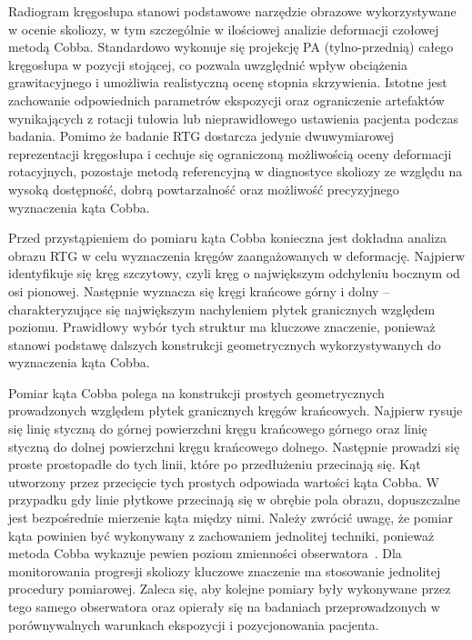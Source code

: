 Radiogram kręgosłupa stanowi podstawowe narzędzie obrazowe wykorzystywane w ocenie skoliozy, w tym szczególnie w ilościowej analizie deformacji czołowej metodą Cobba.
Standardowo wykonuje się projekcję PA (tylno-przednią) całego kręgosłupa w pozycji stojącej, co pozwala uwzględnić wpływ obciążenia grawitacyjnego i umożliwia realistyczną ocenę stopnia skrzywienia.
Istotne jest zachowanie odpowiednich parametrów ekspozycji oraz ograniczenie artefaktów wynikających z rotacji tułowia lub nieprawidłowego ustawienia pacjenta podczas badania.
Pomimo że badanie RTG dostarcza jedynie dwuwymiarowej reprezentacji kręgosłupa i cechuje się ograniczoną możliwością oceny deformacji rotacyjnych, pozostaje metodą referencyjną w diagnostyce skoliozy ze względu na wysoką dostępność, dobrą powtarzalność oraz możliwość precyzyjnego wyznaczenia kąta Cobba.

Przed przystąpieniem do pomiaru kąta Cobba konieczna jest dokładna analiza obrazu RTG w celu wyznaczenia kręgów zaangażowanych w deformację.
Najpierw identyfikuje się kręg szczytowy, czyli kręg o największym odchyleniu bocznym od osi pionowej.
Następnie wyznacza się kręgi krańcowe górny i dolny -- charakteryzujące się największym nachyleniem płytek granicznych względem poziomu.
Prawidłowy wybór tych struktur ma kluczowe znaczenie, ponieważ stanowi podstawę dalszych konstrukcji geometrycznych wykorzystywanych do wyznaczenia kąta Cobba.

Pomiar kąta Cobba polega na konstrukcji prostych geometrycznych prowadzonych względem płytek granicznych kręgów krańcowych.
Najpierw rysuje się linię styczną do górnej powierzchni kręgu krańcowego górnego oraz linię styczną do dolnej powierzchni kręgu krańcowego dolnego.
Następnie prowadzi się proste prostopadłe do tych linii, które po przedłużeniu przecinają się. Kąt utworzony przez przecięcie tych prostych odpowiada wartości kąta Cobba. W przypadku gdy linie płytkowe przecinają się w obrębie pola obrazu, dopuszczalne jest bezpośrednie mierzenie kąta między nimi.
Należy zwrócić uwagę, że pomiar kąta powinien być wykonywany z zachowaniem jednolitej techniki, ponieważ metoda Cobba wykazuje pewien poziom zmienności obserwatora~\cite{gstoettner}.
Dla monitorowania progresji skoliozy kluczowe znaczenie ma stosowanie jednolitej procedury pomiarowej. Zaleca się, aby kolejne pomiary były wykonywane przez tego samego obserwatora oraz opierały się na badaniach przeprowadzonych w porównywalnych warunkach ekspozycji i pozycjonowania pacjenta.

